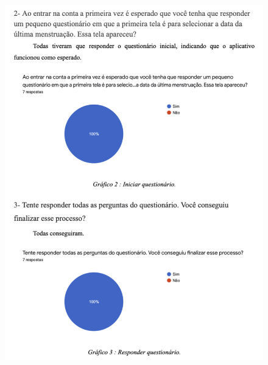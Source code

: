 \begin{apendicesenv}
    \begin{figure}[ht]
        \centering
        \includegraphics[keepaspectratio=true,scale=0.8]{figuras/ap2.png}
    \end{figure}


\end{apendicesenv}
